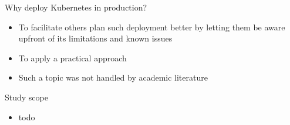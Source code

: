 \documentclass{beamer}
\begin{document}
\begin{frame}{Why deploy Kubernetes in production?}%
	\begin{itemize}
		\item To facilitate others plan such deployment better by letting them be aware upfront of its limitations and known issues
		\item To apply a practical approach
		\item Such a topic was not handled by academic literature
	\end{itemize}
\end{frame}

\begin{frame}{Study scope}%
	\begin{itemize}
		\item todo
	\end{itemize}
\end{frame}
\end{document}
